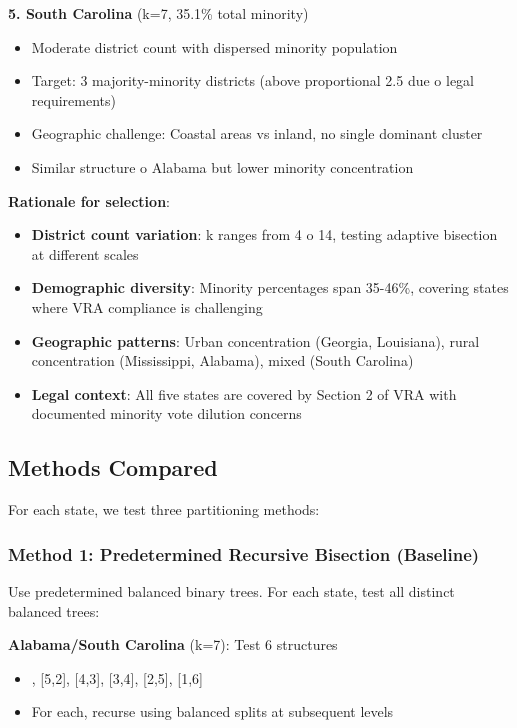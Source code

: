 \textbf{5. South Carolina} (k=7, 35.1\% total minority)
\begin{itemize}
\item Moderate district count with dispersed minority population
\item Target: 3 majority-minority districts (above proportional 2.5 due 	o legal requirements)
\item Geographic challenge: Coastal areas vs inland, no single dominant cluster
\item Similar structure 	o Alabama but lower minority concentration
\end{itemize}

\textbf{Rationale for selection}:
\begin{itemize}
\item \textbf{District count variation}: k ranges from 4 	o 14, testing adaptive bisection at different scales
\item \textbf{Demographic diversity}: Minority percentages span 35-46\%, covering states where VRA compliance is challenging
\item \textbf{Geographic patterns}: Urban concentration (Georgia, Louisiana), rural concentration (Mississippi, Alabama), mixed (South Carolina)
\item \textbf{Legal context}: All five states are covered by Section 2 of VRA with documented minority vote dilution concerns
\end{itemize}

\subsection{Methods Compared}

For each state, we test three partitioning methods:

\subsubsection{Method 1: Predetermined Recursive Bisection (Baseline)}

Use predetermined balanced binary trees. For each state, test all distinct balanced trees:

\textbf{Alabama/South Carolina} (k=7): Test 6 structures
\begin{itemize}
\item [6,1], [5,2], [4,3], [3,4], [2,5], [1,6]
\item For each, recurse using balanced splits at subsequent levels
\end{itemize}

